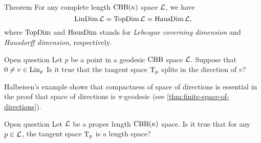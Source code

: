 \begin{thm}{Theorem}\label{thm:dim=dim}
For any complete length $\mathrm{CBB}(\kappa)$ space $\mathcal{L}$, we have
\[\mathop{\rm LinDim}\nolimits \mathcal{L}=\mathop{\rm TopDim}\nolimits \mathcal{L}=\mathop{\rm HausDim}\nolimits \mathcal{L},\]
where $\mathop{\rm TopDim}\nolimits$ and $\mathop{\rm HausDim}\nolimits$ stands for \emph{Lebesgue coverning dimension} and \emph{Hausdorff dimension}, respectively.
\end{thm}

\begin{thm}{Open question}
Let $p$ be a point in a geodesic $\mathrm{CBB}$ space $\mathcal{L}$.
Suppose that $0\ne v\in \mathop{\rm Lin}\nolimits_p$
Is it true that the tangent space $\mathrm{T}_p$ splits in the direction of $v$?
\end{thm}

Halbeisen's example \cite{alexander-kapovitch-petrunin2024,halbeisen} shows that compactness of space of directions is essential in the proof that space of directions is $\pi$-geodesic (see \ref{thm:finite-space-of-directions}).

\begin{thm}{Open question}\label{open:Halb-proper}
Let $\mathcal{L}$ be a proper length $\mathrm{CBB}(\kappa)$ space.
Is it true that for any $p\in \mathcal{L}$, the tangent space $\mathrm{T}_p$ is a length space?
\end{thm}
